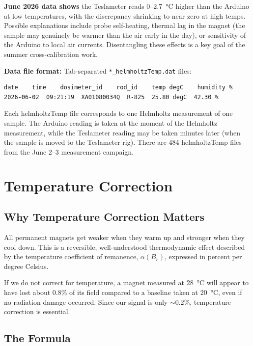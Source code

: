 \documentclass[11pt,letterpaper]{article}
\begin{document}
\textbf{June 2026 data shows} the Teslameter reads 0--\SI{2.7}{\degreeCelsius}
higher than the Arduino at low temperatures, with the discrepancy shrinking to
near zero at high temps. Possible explanations include probe self-heating,
thermal lag in the magnet (the sample may genuinely be warmer than the air early
in the day), or sensitivity of the Arduino to local air currents. Disentangling
these effects is a key goal of the summer cross-calibration work.

\textbf{Data file format:} Tab-separated \texttt{*\_helmholtzTemp.dat} files:

\begin{lstlisting}
date    time    dosimeter_id    rod_id    temp degC    humidity %
2026-06-02  09:21:19  XA01080034Q  R-825  25.80 degC  42.30 %
\end{lstlisting}

Each helmholtzTemp file corresponds to one Helmholtz measurement of one sample.
The Arduino reading is taken at the moment of the Helmholtz measurement, while
the Teslameter reading may be taken minutes later (when the sample is moved to
the Teslameter rig). There are 484 helmholtzTemp files from the June 2--3
measurement campaign.


\section{Temperature Correction}
\label{sec:tempcorr}

\subsection{Why Temperature Correction Matters}

All permanent magnets get weaker when they warm up and stronger when they cool
down. This is a reversible, well-understood thermodynamic effect described by the
temperature coefficient of remanence, $\alpha(B_r)$, expressed in percent per
degree Celsius.

If we do not correct for temperature, a magnet measured at \SI{28}{\degreeCelsius}
will appear to have lost about 0.8\% of its field compared to a baseline taken at
\SI{20}{\degreeCelsius}, even if no radiation damage occurred. Since our signal is
only ${\sim}0.2\%$, temperature correction is essential.

\subsection{The Formula}
\end{document}
